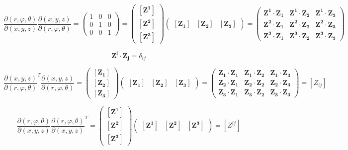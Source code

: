 \documentclass{article} %
\begin{document}
\[
\frac{\partial(r, \varphi, \theta)}{\partial(x,y,z)}
\frac{\partial(x,y,z)}{\partial(r, \varphi, \theta)}
=
\begin{pmatrix}
  1 & 0 & 0 \\
  0 & 1 & 0 \\
  0 & 0 & 1
\end{pmatrix}
=
\begin{pmatrix}
  [\mathbf{Z^1}] \\[0.3cm]
  [\mathbf{Z^2}] \\[0.3cm]
  [\mathbf{Z^3}]
\end{pmatrix}
\begin{pmatrix}
[\mathbf{Z_1}] & [\mathbf{Z_2}] & [\mathbf{Z_3}]
\end{pmatrix}
=
\begin{pmatrix}
  \mathbf{Z^1}\cdot\mathbf{Z_1} & \mathbf{Z^1}\cdot\mathbf{Z_2} & \mathbf{Z^1}\cdot\mathbf{Z_3} \\
  \mathbf{Z^2}\cdot\mathbf{Z_1} & \mathbf{Z^2}\cdot\mathbf{Z_2} & \mathbf{Z^2}\cdot\mathbf{Z_3} \\
  \mathbf{Z^3}\cdot\mathbf{Z_1} & \mathbf{Z^3}\cdot\mathbf{Z_2} & \mathbf{Z^3}\cdot\mathbf{Z_3}
\end{pmatrix}
\]

$$\mathbf{Z^i} \cdot \mathbf{Z_j} = \delta_{ij}$$


\[
\frac{\partial(x,y,z)}{\partial(r, \varphi, \theta)}^T
\frac{\partial(x,y,z)}{\partial(r, \varphi, \theta)}
=
\begin{pmatrix}
  [\mathbf{Z_1}] \\[0.3cm]
  [\mathbf{Z_2}] \\[0.3cm]
  [\mathbf{Z_3}]
\end{pmatrix}
\begin{pmatrix}
[\mathbf{Z_1}] & [\mathbf{Z_2}] & [\mathbf{Z_3}]
\end{pmatrix}
=
\begin{pmatrix}
  \mathbf{Z_1}\cdot\mathbf{Z_1} & \mathbf{Z_1}\cdot\mathbf{Z_2} & \mathbf{Z_1}\cdot\mathbf{Z_3} \\
  \mathbf{Z_2}\cdot\mathbf{Z_1} & \mathbf{Z_2}\cdot\mathbf{Z_2} & \mathbf{Z_2}\cdot\mathbf{Z_3} \\
  \mathbf{Z_3}\cdot\mathbf{Z_1} & \mathbf{Z_3}\cdot\mathbf{Z_2} & \mathbf{Z_3}\cdot\mathbf{Z_3}
\end{pmatrix}
=[Z_{ij}]
\]

\[
\frac{\partial(r, \varphi, \theta)}{\partial(x,y,z)}
\frac{\partial(r, \varphi, \theta)}{\partial(x,y,z)}^T
=
\begin{pmatrix}
  [\mathbf{Z^1}] \\[0.3cm]
  [\mathbf{Z^2}] \\[0.3cm]
  [\mathbf{Z^3}]
\end{pmatrix}
\begin{pmatrix}
[\mathbf{Z^1}] & [\mathbf{Z^2}] & [\mathbf{Z^3}]
\end{pmatrix}
=
[Z^{ij}]
\]
\end{document}
